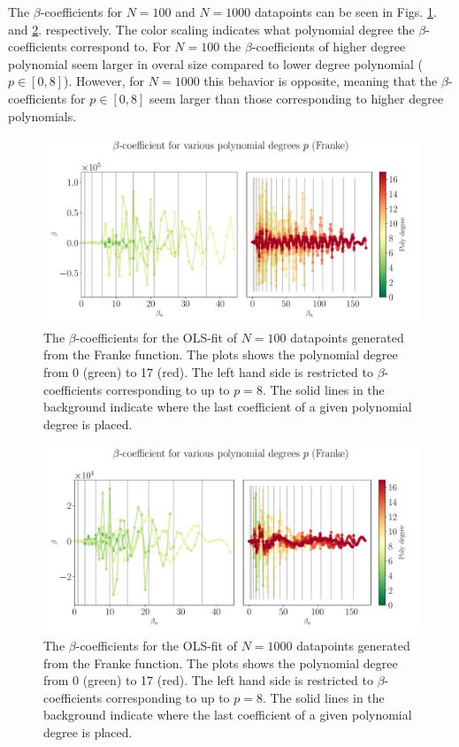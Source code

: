 \documentclass[%
reprint,
amsmath,amssymb,
aps,
pra,
]{revtex4-2}
\begin{document}
The \(\beta\)-coefficients for \(N=100\) and \(N=1000\) datapoints can be seen in Figs. \ref{fig:OLS_beta_degree_100}. and \ref{fig:OLS_beta_degree_1000}. respectively. The color scaling indicates what polynomial degree the \(\beta\)-coefficients correspond to. For \(N=100\) the \(\beta\)-coefficients of higher degree polynomial seem larger in overal size compared to lower degree polynomial (\(p\in[0,8]\)). However, for \(N=1000\) this behavior is opposite, meaning that the \(\beta\)-coefficients for \(p\in[0,8]\) seem larger than those corresponding to higher degree polynomials.

\begin{figure}[H]
	\hspace{-7.5mm}
	\includegraphics[width=1.15\linewidth]{Python/Figures/OLS/OLS_betano_scaling_100.pdf}
	\caption{The \(\beta\)-coefficients for the OLS-fit of \(N=100\) datapoints generated from the Franke function. The plots shows the polynomial degree from 0 (green) to 17 (red). The left hand side is restricted to \(\beta\)-coefficients corresponding to up to \(p=8\). The solid lines in the background indicate where the last coefficient of a given polynomial degree is placed.}
	\label{fig:OLS_beta_degree_100}
\end{figure}
\begin{figure}[H]
	\hspace{-7.5mm}
	\includegraphics[width=1.15\linewidth]{Python/Figures/OLS/OLS_betano_scaling_1000.pdf}
	\caption{The \(\beta\)-coefficients for the OLS-fit of \(N=1000\) datapoints generated from the Franke function. The plots shows the polynomial degree from 0 (green) to 17 (red). The left hand side is restricted to \(\beta\)-coefficients corresponding to up to \(p=8\). The solid lines in the background indicate where the last coefficient of a given polynomial degree is placed.}
	\label{fig:OLS_beta_degree_1000}
\end{figure}
\end{document}
